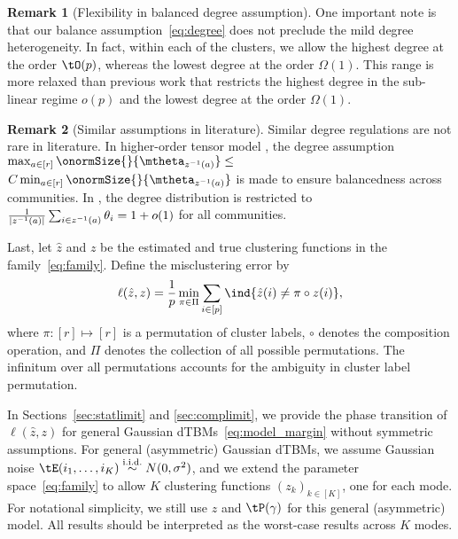 \documentclass[lettersize,onecolumn,journal]{IEEEtran}
\theoremstyle{definition}
\theoremstyle{definition}
\newtheorem{rmk}{Remark}
\begin{document}
{\begin{rmk}[Flexibility in balanced degree assumption] One important note is that our balance assumption~\eqref{eq:degree} does not preclude the mild degree heterogeneity. In fact, within each of the clusters, we allow the highest degree at the order $\tO(p)$, whereas the lowest degree at the order $\Omega(1)$. This range is more relaxed than previous work \citep{gao2018community} that restricts the highest degree in the sub-linear regime $o(p)$ and the lowest degree at the order $\Omega(1)$. 
\end{rmk}

\begin{rmk}[Similar assumptions in literature]
Similar degree regulations are not rare in literature. In higher-order tensor model \citep{ke2019community}, the degree assumption $\max_{a\in[r]} \onormSize{}{\mtheta_{z^{-1}(a)}} \leq $ $ C \min_{a\in[r]}\onormSize{}{\mtheta_{z^{-1}(a)}}$ is made to ensure balancedness across communities. %
In \cite{gao2018community}, the degree distribution is restricted to ${1\over |z^{-1}(a)|}\sum_{i\in z^{-1}(a)}\theta_i=1+o(1)$ for all communities. 
\end{rmk}
}

Last, let $\hat z$ and $z$ be the estimated and true clustering functions in the family~\eqref{eq:family}. Define the misclustering error by
\[
\ell(\hat z, z)={1\over p}\min_{\pi \in \Pi}\sum_{i\in[p]}\ind\{\hat z(i)\neq \pi \circ z(i)\},
\]
where $\pi: [r] \mapsto [r]$ is a permutation of cluster labels, $\circ$ denotes the composition operation, and $\Pi$ denotes the collection of all possible permutations. The infinitum over all permutations accounts for the ambiguity in cluster label permutation. 

In Sections~\ref{sec:statlimit} and \ref{sec:complimit}, we provide the phase transition of $\ell (\hat z, z)$ for general Gaussian dTBMs~\eqref{eq:model_margin} without symmetric assumptions. For general (asymmetric) Gaussian dTBMs, we assume Gaussian noise $\tE(i_1,\ldots,i_K)\stackrel{\text{i.i.d.}}{\sim} N(0,\sigma^2)$, and we extend the parameter space~\eqref{eq:family} to allow $K$ clustering functions $(z_k)_{k\in[K]}$, one for each mode. For notational simplicity, we still use $z$ and $\tP(\gamma)$ for this general (asymmetric) model. All results should be interpreted as the worst-case results across $K$ modes. 
\end{document}
